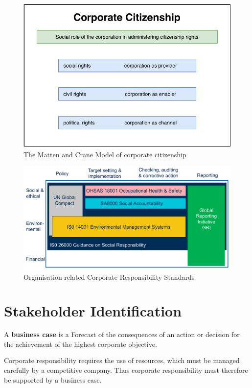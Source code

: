 \documentclass[11pt]{article}
\theoremstyle{definition}
\begin{document}
\begin{figure}[htb]
	\centering
	\includegraphics[width=0.7\linewidth]{img/Matten_Crane_corporate_citizenship.pdf}
	\caption{The Matten and Crane Model of corporate citizenship}
\end{figure}

\begin{figure}[htb]
	\centering
	\includegraphics[width=0.8\linewidth]{img/corporate_responsibility_standards}
	\caption{Organisation-related Corporate Responsibility Standards}
	\label{fig:corporateresponsibilitystandards}
\end{figure}

\clearpage
\section{Stakeholder Identification}
\begin{definition}
	A \textbf{business case} is a Forecast of the consequences of an action or decision for the achievement of the highest corporate objective.
\end{definition}

Corporate responsibility requires the use of resources, which must be managed carefully by a competitive company. Thus corporate responsibility must therefore be supported by a business case.
\end{document}
